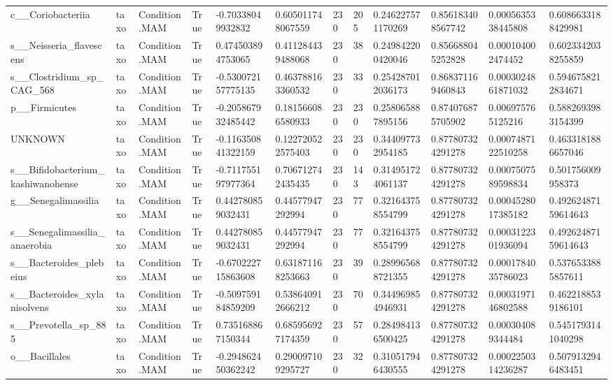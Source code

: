 \begin{longtable}{llllllllllll}
c\_\_Coriobacteriia & taxo & Condition.MAM & True & -0.70338049932832 & 0.605011748067559 & 230 & 205 & 0.246227571170269 & 0.856183408567742 & 0.0005635338445808 & 0.6086633188429981 \\
s\_\_Neisseria\_flavescens & taxo & Condition.MAM & True & 0.474503894753065 & 0.411284439488068 & 230 & 38 & 0.249842200420046 & 0.856688045252828 & 0.000104002474452 & 0.6023342038255859 \\
s\_\_Clostridium\_sp\_CAG\_568 & taxo & Condition.MAM & True & -0.530072157775135 & 0.463788163360532 & 230 & 33 & 0.254287012036173 & 0.868371169460843 & 0.0003024861871032 & 0.5946758212834671 \\
p\_\_Firmicutes & taxo & Condition.MAM & True & -0.205867932485442 & 0.181566086580933 & 230 & 230 & 0.258065887895156 & 0.874076875705902 & 0.006975765125216 & 0.5882693983154399 \\
UNKNOWN & taxo & Condition.MAM & True & -0.116350841322159 & 0.122720522575403 & 230 & 230 & 0.344097732954185 & 0.877807324291278 & 0.0007487122510258 & 0.4633181886657046 \\
s\_\_Bifidobacterium\_kashiwanohense & taxo & Condition.MAM & True & -0.711755197977364 & 0.706712742435435 & 230 & 143 & 0.314951724061137 & 0.877807324291278 & 0.0007507589598834 & 0.501756009958373 \\
g\_\_Senegalimassilia & taxo & Condition.MAM & True & 0.442780859032431 & 0.44577947292994 & 230 & 77 & 0.321643758554799 & 0.877807324291278 & 0.0004528017385182 & 0.49262487159614643 \\
s\_\_Senegalimassilia\_anaerobia & taxo & Condition.MAM & True & 0.442780859032431 & 0.44577947292994 & 230 & 77 & 0.321643758554799 & 0.877807324291278 & 0.0003122301936094 & 0.49262487159614643 \\
s\_\_Bacteroides\_plebeius & taxo & Condition.MAM & True & -0.670222715863608 & 0.631871168253663 & 230 & 39 & 0.289965688721355 & 0.877807324291278 & 0.0001784035786023 & 0.5376533885857611 \\
s\_\_Bacteroides\_xylanisolvens & taxo & Condition.MAM & True & -0.509759184859209 & 0.538640912666212 & 230 & 70 & 0.344969854946931 & 0.877807324291278 & 0.0003197146802588 & 0.4622188539186101 \\
s\_\_Prevotella\_sp\_885 & taxo & Condition.MAM & True & 0.735168867150344 & 0.685956927174359 & 230 & 57 & 0.284984136500425 & 0.877807324291278 & 0.000304089344484 & 0.5451793141040298 \\
o\_\_Bacillales & taxo & Condition.MAM & True & -0.294862450362242 & 0.290097109295727 & 230 & 32 & 0.310517946430555 & 0.877807324291278 & 0.0002250314236287 & 0.5079132946483451 \\

\end{longtable}
